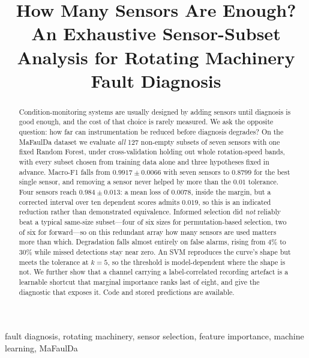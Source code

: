 \documentclass[conference]{IEEEtran}
\begin{document}
\title{How Many Sensors Are Enough? An Exhaustive Sensor-Subset Analysis for
Rotating Machinery Fault Diagnosis}

\author{
}

\maketitle

\begin{abstract}
Condition-monitoring systems are usually designed by adding sensors until
diagnosis is good enough, and the cost of that choice is rarely measured. We
ask the opposite question: how far can instrumentation be reduced before
diagnosis degrades? On the MaFaulDa dataset we evaluate \emph{all} 127
non-empty subsets of seven sensors with one fixed Random Forest, under
cross-validation holding out whole rotation-speed bands, with every subset
chosen from training data alone and three hypotheses fixed in advance.
Macro-F1 falls from $0.9917 \pm 0.0066$ with seven sensors to $0.8799$ for the
best single sensor, and removing a sensor never helped by more than the $0.01$
tolerance. Four sensors reach $0.984 \pm 0.013$: a mean loss of $0.0078$,
inside the margin, but a corrected interval over ten dependent scores admits
$0.019$, so this is an indicated reduction rather than demonstrated
equivalence. Informed selection did \emph{not} reliably beat a typical
same-size subset---four of six sizes for permutation-based selection, two of
six for forward---so on this redundant array how many sensors are used matters
more than which. Degradation falls almost entirely on false alarms, rising
from 4\% to 30\% while missed detections stay near zero. An SVM reproduces the
curve's shape but meets the tolerance at $k=5$, so the threshold is
model-dependent where the shape is not. We further show that a channel
carrying a label-correlated recording artefact is a learnable shortcut that
marginal importance ranks last of eight, and give the diagnostic that exposes
it. Code and stored predictions are available.
\end{abstract}

\begin{IEEEkeywords}
fault diagnosis, rotating machinery, sensor selection, feature importance,
machine learning, MaFaulDa
\end{IEEEkeywords}
\end{document}
